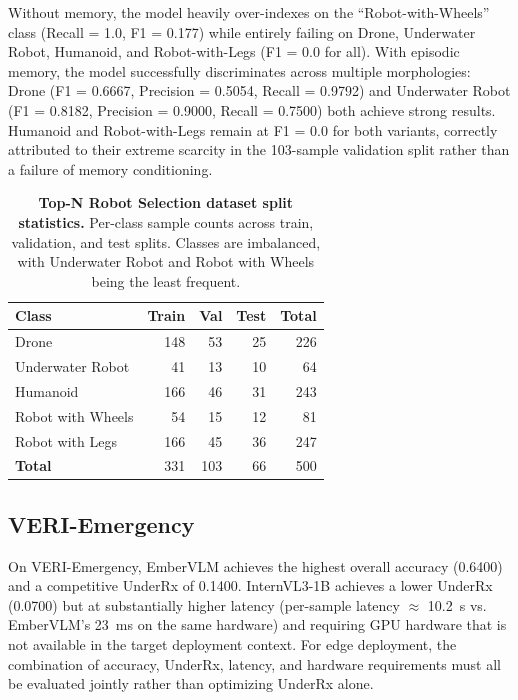 Without memory, the model heavily over-indexes on the ``Robot-with-Wheels'' class (Recall = 1.0, F1 = 0.177) while entirely failing on Drone, Underwater Robot, Humanoid, and Robot-with-Legs (F1 = 0.0 for all). With episodic memory, the model successfully discriminates across multiple morphologies: Drone (F1 = 0.6667, Precision = 0.5054, Recall = 0.9792) and Underwater Robot (F1 = 0.8182, Precision = 0.9000, Recall = 0.7500) both achieve strong results. Humanoid and Robot-with-Legs remain at F1 = 0.0 for both variants, correctly attributed to their extreme scarcity in the 103-sample validation split rather than a failure of memory conditioning.

\begin{table}[htbp]
\centering
\caption{\textbf{Top-N Robot Selection dataset split statistics.} Per-class sample counts across train, validation, and test splits. Classes are imbalanced, with Underwater Robot and Robot with Wheels being the least frequent.}
\label{tab:robot_dataset_stats}
\begin{tabular}{lrrrr}
\toprule
\textbf{Class} & \textbf{Train} & \textbf{Val} & \textbf{Test} & \textbf{Total} \\
\midrule
Drone & 148 & 53 & 25 & 226 \\
Underwater Robot & 41 & 13 & 10 & 64 \\
Humanoid & 166 & 46 & 31 & 243 \\
Robot with Wheels & 54 & 15 & 12 & 81 \\
Robot with Legs & 166 & 45 & 36 & 247 \\
\midrule
\textbf{Total} & 331 & 103 & 66 & 500 \\
\bottomrule
\end{tabular}
\end{table}

\subsection{VERI-Emergency}

On VERI-Emergency, EmberVLM achieves the highest overall accuracy (0.6400) and a competitive UnderRx of 0.1400. InternVL3-1B achieves a lower UnderRx (0.0700) but at substantially higher latency (per-sample latency $\approx$ 10.2~s vs. EmberVLM's 23~ms on the same hardware) and requiring GPU hardware that is not available in the target deployment context. For edge deployment, the combination of accuracy, UnderRx, latency, and hardware requirements must all be evaluated jointly rather than optimizing UnderRx alone.


